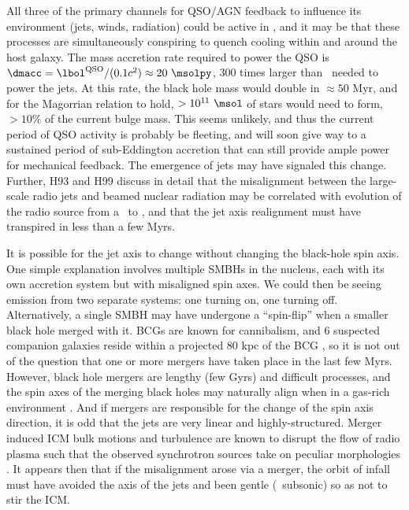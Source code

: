 \documentclass[useAMS,usenatbib]{mn2e}
\begin{document}
All three of the primary channels for QSO/AGN feedback to influence
its environment (jets, winds, radiation) could be active in \irs, and
it may be that these processes are simultaneously conspiring to quench
cooling within and around the host galaxy. The mass accretion rate
required to power the QSO is $\dmacc = \lqso/(0.1 c^2) \approx 20
~\msolpy$, 300 times larger than \dmacc\ needed to power the jets. At
this rate, the black hole mass would double in $\approx 50$ Myr, and
for the Magorrian relation to hold, $> 10^{11} ~\msol$ of stars would
need to form, $> 10\%$ of the current bulge mass. This seems unlikely,
and thus the current period of QSO activity is probably be fleeting,
and will soon give way to a sustained period of sub-Eddington
accretion that can still provide ample power for mechanical
feedback. The emergence of jets may have signaled this
change. Further, H93 and H99 discuss in detail that the misalignment
between the large-scale radio jets and beamed nuclear radiation may be
correlated with evolution of the radio source from a \frii\ to \fri,
and that the jet axis realignment must have transpired in less than a
few Myrs.

It is possible for the jet axis to change without changing the
black-hole spin axis. One simple explanation involves multiple SMBHs
in the nucleus, each with its own accretion system but with misaligned
spin axes. We could then be seeing emission from two separate systems:
one turning on, one turning off. Alternatively, a single SMBH may have
undergone a ``spin-flip'' \citep{2002Sci...297.1310M} when a smaller
black hole merged with it. BCGs are known for cannibalism, and 6
suspected companion galaxies reside within a projected 80 kpc of the
BCG \citep{1996AJ....111..649S, 1999Ap&SS.266..113A}, so it is not out
of the question that one or more mergers have taken place in the last
few Myrs. However, black hole mergers are lengthy (few Gyrs) and
difficult processes, and the spin axes of the merging black holes may
naturally align when in a gas-rich environment
\citep{2007ApJ...661L.147B}. And if mergers are responsible for the
change of the spin axis direction, it is odd that the jets are very
linear and highly-structured. Merger induced ICM bulk motions and
turbulence are known to disrupt the flow of radio plasma such that the
observed synchrotron sources take on peculiar morphologies
\citep[\eg][]{2009A&A...495..721S, 2010arXiv1002.0395S}. It appears
then that if the misalignment arose via a merger, the orbit of infall
must have avoided the axis of the jets and been gentle (\ie\ subsonic)
so as not to stir the ICM.
\end{document}
